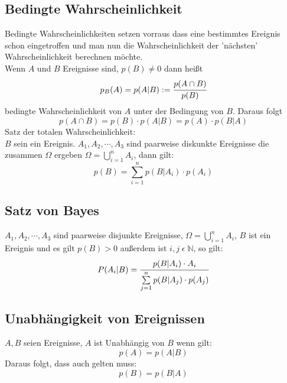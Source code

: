 \documentclass[a4paper]{scrartcl}
\begin{document}
        \subsection{Bedingte Wahrscheinlichkeit}
            Bedingte Wahrscheinlichkeiten setzen vorraus dass eine bestimmtes Ereignis schon eingetroffen und man nun die Wahrscheinlichkeit der 'nächsten' Wahrscheinlichkeit berechnen möchte. \\
            Wenn \(A\) und \(B\) Ereignisse sind, \(p(B) \neq 0\) dann heißt 
            \begin{equation*}
                p_B(A) = p(A|B) := \cfrac{p (A \cap B)}{p(B)}
            \end{equation*} 
            bedingte Wahrscheinlichkeit von \(A\) unter der Bedingung von \(B\). Daraus folgt 
            \begin{equation*}
                p(A \cap B) = p(B) \cdot p(A|B) = p(A) \cdot p(B|A) 
            \end{equation*}
            Satz der totalen Wahrscheinlichkeit:\\
            \(B\) sein ein Ereignis. \(A_1,A_2,\cdots,A_3\) sind paarweise diskunkte Ereignisse die zusammen \(\Omega\) ergeben \(\Omega = \bigcup\limits_{i=1}^n A_i \), dann gilt: 
            \begin{equation*}
                p(B) = \sum\limits_{i=1}^n p(B|A_i) \cdot p(A_i)
            \end{equation*}
        \subsection{Satz von Bayes}
            \(A_1,A_2,\cdots,A_3\) sind paarweise disjunkte Ereignisse, \(\Omega = \bigcup\limits_{i=1}^n A_i\), \(B\) ist ein Ereignis und es gilt \(p(B) > 0\) außerdem ist \(i,j \; \epsilon \; \mathbb{N}\), so gilt:
            \begin{equation*}
                P(A_i|B) = \cfrac{p(B|A_i) \cdot A_i}{\sum\limits_{j=1}^n p(B|A_j) \cdot p(A_j)} %
            \end{equation*}
        \subsection{Unabhängigkeit von Ereignissen}
            \(A, B\) seien Ereignisse, \(A\) ist Unabhängig von \(B\) wenn gilt:
            \begin{equation*}
                p(A) = p(A|B)
            \end{equation*}
            Daraus folgt, dass auch gelten muss: 
            \begin{equation*}
                p(B) = p(B|A)
            \end{equation*}
\end{document}
